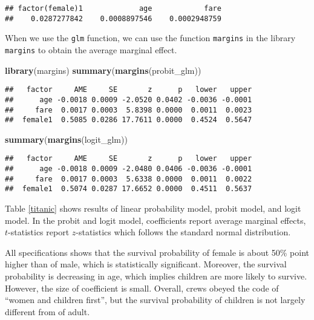 \documentclass[
  12pt,
]{article}
\newenvironment{Shaded}{\begin{snugshade}}{\end{snugshade}}
\newcommand{\KeywordTok}[1]{\textcolor[rgb]{0.13,0.29,0.53}{\textbf{#1}}}
\newcommand{\NormalTok}[1]{#1}
\begin{document}
\begin{verbatim}
## factor(female)1             age            fare 
##    0.0287277842    0.0008897546    0.0002948759
\end{verbatim}

When we use the \texttt{glm} function, we can use the function
\texttt{margins} in the library \texttt{margins} to obtain the average
marginal effect.

\begin{Shaded}
\begin{Highlighting}[]
\KeywordTok{library}\NormalTok{(margins)}
\KeywordTok{summary}\NormalTok{(}\KeywordTok{margins}\NormalTok{(probit\_glm))}
\end{Highlighting}
\end{Shaded}

\begin{verbatim}
##   factor     AME     SE       z      p   lower   upper
##      age -0.0018 0.0009 -2.0520 0.0402 -0.0036 -0.0001
##     fare  0.0017 0.0003  5.8398 0.0000  0.0011  0.0023
##  female1  0.5085 0.0286 17.7611 0.0000  0.4524  0.5647
\end{verbatim}

\begin{Shaded}
\begin{Highlighting}[]
\KeywordTok{summary}\NormalTok{(}\KeywordTok{margins}\NormalTok{(logit\_glm))}
\end{Highlighting}
\end{Shaded}

\begin{verbatim}
##   factor     AME     SE       z      p   lower   upper
##      age -0.0018 0.0009 -2.0480 0.0406 -0.0036 -0.0001
##     fare  0.0017 0.0003  5.6338 0.0000  0.0011  0.0022
##  female1  0.5074 0.0287 17.6652 0.0000  0.4511  0.5637
\end{verbatim}

Table \ref{titanic} shows results of linear probability model, probit
model, and logit model. In the probit and logit model, coefficients
report average marginal effects, \(t\)-statistics report
\(z\)-statistics which follows the standard normal distribution.

All specifications shows that the survival probability of female is
about 50\% point higher than of male, which is statistically
significant. Moreover, the survival probability is decreasing in age,
which implies children are more likely to survive. However, the size of
coefficient is small. Overall, crews obeyed the code of ``women and
children first'', but the survival probability of children is not
largely different from of adult.
\end{document}
